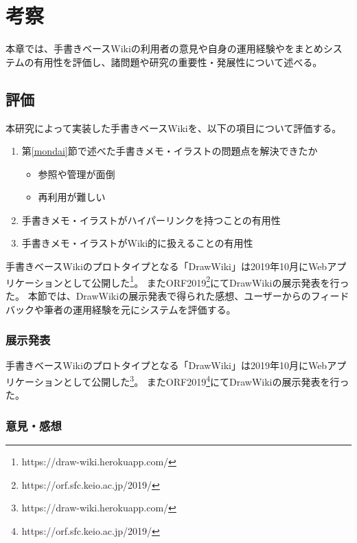 \chapter{考察}
\label{chap:kosatsu}

本章では、手書きベースWikiの利用者の意見や自身の運用経験やをまとめシステムの有用性を評価し、諸問題や研究の重要性・発展性について述べる。

\newpage

\section{評価}
本研究によって実装した手書きベースWikiを、以下の項目について評価する。

\begin{enumerate}
    \item 第\ref{mondai}節で述べた手書きメモ・イラストの問題点を解決できたか
    \begin{itemize}
              \item 参照や管理が面倒
              \item 再利用が難しい
    \end{itemize}
    \item 手書きメモ・イラストがハイパーリンクを持つことの有用性
    \item 手書きメモ・イラストがWiki的に扱えることの有用性
\end{enumerate}


手書きベースWikiのプロトタイプとなる「DrawWiki」は2019年10月にWebアプリケーションとして公開した\footnote{ \textsf{https://draw-wiki.herokuapp.com/} }。
またORF2019\footnote{ \textsf{https://orf.sfc.keio.ac.jp/2019/} }にてDrawWikiの展示発表を行った。
本節では、DrawWikiの展示発表で得られた感想、ユーザーからのフィードバックや筆者の運用経験を元にシステムを評価する。

\subsection{展示発表}
手書きベースWikiのプロトタイプとなる「DrawWiki」は2019年10月にWebアプリケーションとして公開した\footnote{ \textsf{https://draw-wiki.herokuapp.com/} }。
またORF2019\footnote{ \textsf{https://orf.sfc.keio.ac.jp/2019/} }にてDrawWikiの展示発表を行った。

\subsection{意見・感想}

